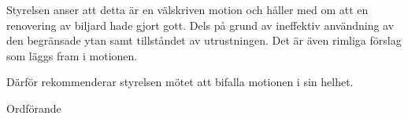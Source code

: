 \documentclass[../_main/handlingar.tex]{subfiles}
\begin{document}
\motionssvar


Styrelsen anser att detta är en välskriven motion och håller med om att en renovering av biljard hade gjort gott. Dels på grund av ineffektiv användning av den begränsade ytan samt tillståndet av utrustningen. Det är även rimliga förslag som läggs fram i motionen. 



Därför rekommenderar styrelsen mötet att bifalla motionen i sin helhet.


\begin{signatures}{1}
    \ist
    \signature{\ordf}{Ordförande}
\end{signatures}
\end{document}
